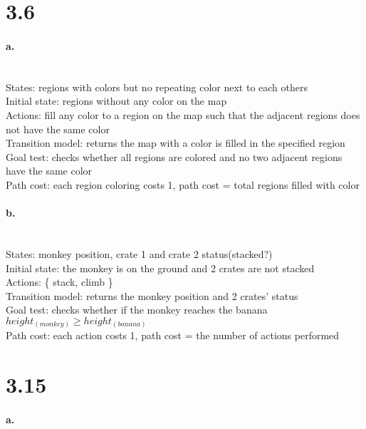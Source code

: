\documentclass[a4paper]{article}
\begin{document}
\vspace{1 cm}

\section*{3.6}

\paragraph{a.} ~\\
\indent States: regions with colors but no repeating color next to each others \\
\indent Initial state: regions without any color on the map \\
\indent Actions: fill any color to a region on the map such that the adjacent regions does not have the same color \\
\indent Transition model: returns the map with a color is filled in the specified region \\
\indent Goal test: checks whether all regions are colored and no two adjacent regions have the same color \\
\indent Path cost: each region coloring costs 1, path cost = total regions filled with color \\

\paragraph{b.} ~\\
\indent States: monkey position, crate 1 and crate 2 status(stacked?) \\
\indent Initial state: the monkey is on the ground and 2 crates are not stacked \\
\indent Actions: \{ stack, climb \} \\
\indent Transition model: returns the monkey position and 2 crates' status \\
\indent Goal test: checks whether if the monkey reaches the banana $height_{(monkey)} \geq height_{(banana)} $ \\
\indent Path cost: each action costs 1, path cost = the number of actions performed

\section*{3.15}

\paragraph{a.} ~\\
\end{document}

